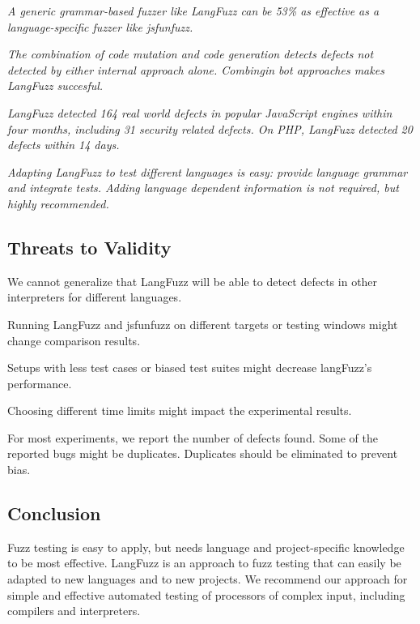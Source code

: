 \textit{A generic grammar-based fuzzer like LangFuzz can be 53\% as effective as a language-specific fuzzer like jsfunfuzz.}

\textit{The combination of code mutation and code generation detects defects not detected by either internal approach alone. Combingin bot approaches makes LangFuzz succesful.}

\textit{LangFuzz detected 164 real world defects in popular JavaScript engines within four months, including 31 security related defects. On PHP, LangFuzz detected 20 defects within 14 days.}

\textit{Adapting LangFuzz to test different languages is easy: provide language grammar and integrate tests. Adding language dependent information is not required, but highly recommended.}

\subsection{Threats to Validity}
We cannot generalize that LangFuzz will be able to detect defects in other interpreters for different languages.

Running LangFuzz and jsfunfuzz on different targets or testing windows might change comparison results.

Setups with less test cases or biased test suites might decrease langFuzz's performance.

Choosing different time limits might impact the experimental results.

For most experiments, we report the number of defects found.
Some of the reported bugs might be duplicates.
Duplicates should be eliminated to prevent bias.

\subsection{Conclusion}
Fuzz testing is easy to apply, but needs language and project-specific knowledge to be most effective.
LangFuzz is an approach to fuzz testing that can easily be adapted to new languages and to new projects.
We recommend our approach for simple and effective automated testing of processors of complex input, including compilers and interpreters.